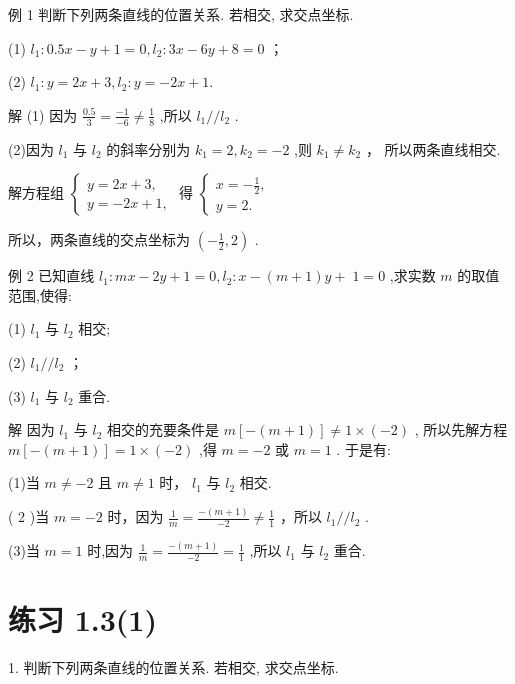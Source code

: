 \documentclass[10pt]{article}
\begin{document}
例 1 判断下列两条直线的位置关系. 若相交, 求交点坐标.

(1) \({l}_{1} : {0.5x} - y + 1 = 0,{l}_{2} : {3x} - {6y} + 8 = 0\) ；

(2) \({l}_{1} : y = {2x} + 3,{l}_{2} : y =  - {2x} + 1.\)

解 (1) 因为 \(\frac{0.5}{3} = \frac{-1}{-6} \neq  \frac{1}{8}\) ,所以 \({l}_{1}//{l}_{2}\) .

(2)因为 \({l}_{1}\) 与 \({l}_{2}\) 的斜率分别为 \({k}_{1} = 2,{k}_{2} =  - 2\) ,则 \({k}_{1} \neq  {k}_{2}\) ， 所以两条直线相交.

解方程组 \(\left\{  \begin{array}{l} y = {2x} + 3, \\  y =  - {2x} + 1, \end{array}\right.\) 得 \(\left\{  \begin{array}{l} x =  - \frac{1}{2}, \\  y = 2. \end{array}\right.\)

所以，两条直线的交点坐标为 \(\left( {-\frac{1}{2},2}\right)\) .

例 2 已知直线 \({l}_{1} : {mx} - {2y} + 1 = 0,{l}_{2} : x - \left( {m + 1}\right) y + \; 1 = 0\) ,求实数 \(m\) 的取值范围,使得:

(1) \({l}_{1}\) 与 \({l}_{2}\) 相交;

(2) \({l}_{1}//{l}_{2}\) ；

(3) \({l}_{1}\) 与 \({l}_{2}\) 重合.

解 因为 \({l}_{1}\) 与 \({l}_{2}\) 相交的充要条件是 \(m\left\lbrack  {-\left( {m + 1}\right) }\right\rbrack   \neq  1 \times  \left( {-2}\right)\) , 所以先解方程 \(m\left\lbrack  {-\left( {m + 1}\right) }\right\rbrack   = 1 \times  \left( {-2}\right)\) ,得 \(m =  - 2\) 或 \(m = 1\) . 于是有:

(1)当 \(m \neq   - 2\) 且 \(m \neq  1\) 时， \({l}_{1}\) 与 \({l}_{2}\) 相交.

( 2 )当 \(m =  - 2\) 时，因为 \(\frac{1}{m} = \frac{-\left( {m + 1}\right) }{-2} \neq  \frac{1}{1}\) ，所以 \({l}_{1}//{l}_{2}\) .

(3)当 \(m = 1\) 时,因为 \(\frac{1}{m} = \frac{-\left( {m + 1}\right) }{-2} = \frac{1}{1}\) ,所以 \({l}_{1}\) 与 \({l}_{2}\) 重合.

\section*{练习 1.3(1)}

1. 判断下列两条直线的位置关系. 若相交, 求交点坐标.
\end{document}
